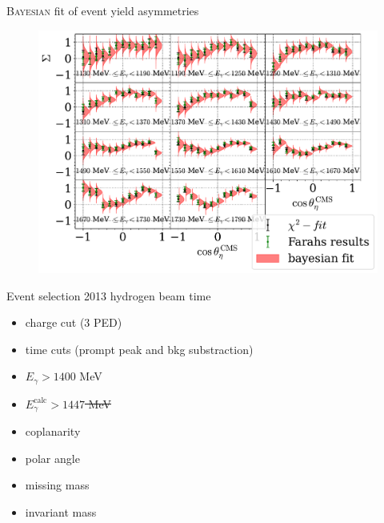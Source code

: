 \documentclass[11pt,aspectratio=169,dvipsnames]{beamer}
\begin{document}
	\begin{frame}{\textsc{Bayesian} fit of event yield asymmetries}
		\begin{figure}
			\includegraphics[width=.8\linewidth]{../../bayes/realdeal/sigma_eta.pdf}
		\end{figure}
	\end{frame}
	
	\begin{frame}{Event selection}
		2013 hydrogen beam time
		\begin{itemize}
			\item charge cut (3 PED)
			\item time cuts (prompt peak and bkg substraction)
			\item $E_\gamma > 1400$ MeV
			\item\sout{$E_\gamma^\text{calc}>1447$ MeV}
			\item coplanarity
			\item polar angle
			\item missing mass
			\item  invariant mass
		\end{itemize}
	\end{frame}
\end{document}
